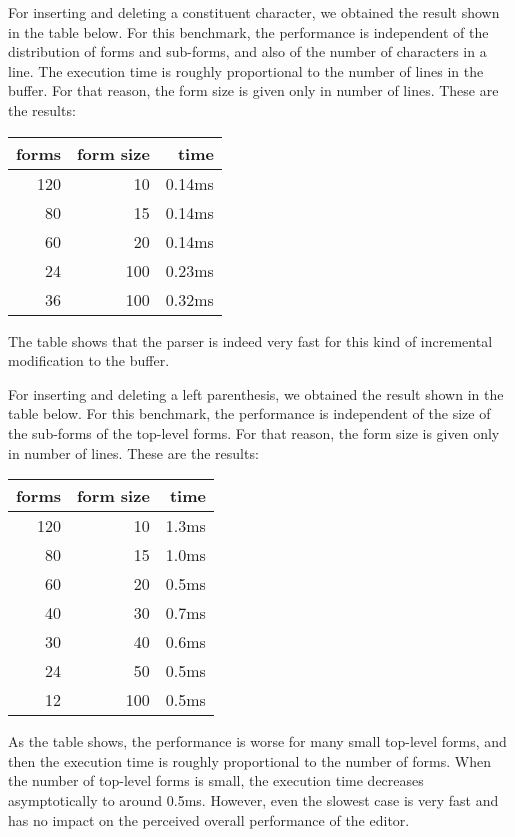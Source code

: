 For inserting and deleting a constituent character, we obtained the
result shown in the table below.  For this benchmark, the performance
is independent of the distribution of forms and sub-forms, and also of
the number of characters in a line.  The execution time is roughly
proportional to the number of lines in the buffer.  For that reason,
the form size is given only in number of lines.  These are the
results:

\vskip 0.3cm
\begin{tabular}{|r|r|r|}
\hline
forms & form size & time\\
\hline
120 & 10 & 0.14ms\\
80 & 15  & 0.14ms\\
60 & 20  & 0.14ms\\
24 & 100 & 0.23ms\\
36 & 100 & 0.32ms\\
\hline
\end{tabular}
\vskip 0.3cm

\noindent
The table shows that the parser is indeed very fast for this kind of
incremental modification to the buffer.

For inserting and deleting a left parenthesis, we obtained the
result shown in the table below.  For this benchmark, the performance
is independent of the size of the sub-forms of the top-level forms.
For that reason, the form size is given only in number of lines.
These are the results:

\vskip 0.3cm
\begin{tabular}{|r|r|r|}
\hline
forms & form size & time\\
\hline
120 & 10 & 1.3ms\\
80 & 15  & 1.0ms\\
60 & 20  & 0.5ms\\
40 & 30  & 0.7ms\\
30 & 40  & 0.6ms\\
24 & 50  & 0.5ms\\
12 & 100 & 0.5ms\\
\hline
\end{tabular}
\vskip 0.3cm

As the table shows, the performance is worse for many small top-level
forms, and then the execution time is roughly proportional to the
number of forms.  When the number of top-level forms is small, the
execution time decreases asymptotically to around 0.5ms.  However,
even the slowest case is very fast and has no impact on the perceived
overall performance of the editor.

